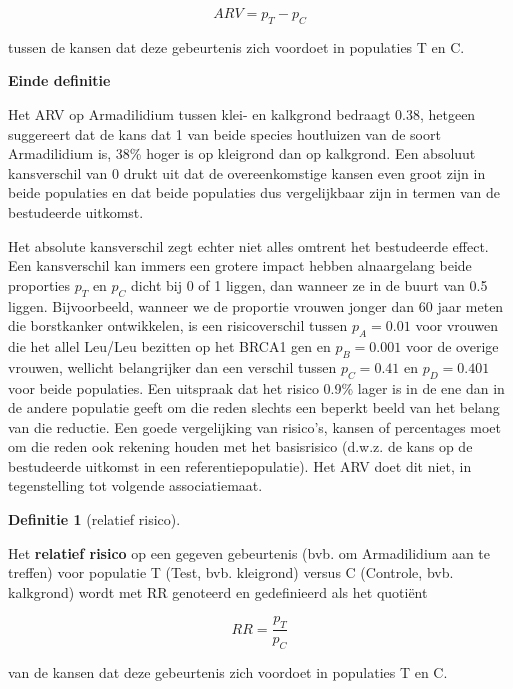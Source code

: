 \documentclass[
  12pt,dutch,coursenotes]{book}
\theoremstyle{definition}
\newtheorem{definition}{Definitie}[chapter]
\theoremstyle{definition}
\theoremstyle{definition}
\theoremstyle{remark}
\begin{document}
\begin{equation*}
ARV=p_T-p_C
\end{equation*}

tussen de kansen dat deze gebeurtenis zich voordoet in populaties T en C.

\textbf{Einde definitie}

Het ARV op Armadilidium tussen klei- en kalkgrond bedraagt 0.38, hetgeen suggereert dat de kans dat 1 van beide species houtluizen van de soort Armadilidium is, 38\% hoger is op kleigrond dan op kalkgrond. Een absoluut kansverschil
van 0 drukt uit dat de overeenkomstige kansen even groot zijn in beide
populaties en dat beide populaties dus vergelijkbaar zijn in termen van de bestudeerde uitkomst.

Het absolute kansverschil zegt echter niet alles omtrent het
bestudeerde effect. Een kansverschil kan immers een grotere impact hebben
alnaargelang beide proporties \(p_T\) en \(p_C\) dicht bij 0 of 1 liggen, dan
wanneer ze in de buurt van 0.5 liggen.
Bijvoorbeeld, wanneer we de proportie
vrouwen jonger dan 60 jaar meten die borstkanker ontwikkelen, is
een risicoverschil tussen \(p_A=0.01\) voor vrouwen die het allel Leu/Leu bezitten op het BRCA1 gen
en \(p_B=0.001\) voor de overige vrouwen, wellicht belangrijker dan een verschil tussen \(p_C=0.41\) en \(p_D=0.401\) voor beide populaties. Een uitspraak dat het risico 0.9\% lager is in de ene dan in de andere populatie geeft om die reden slechts een beperkt beeld van het belang van die reductie. Een goede vergelijking van risico's, kansen of percentages moet om die reden ook rekening houden met het basisrisico (d.w.z. de kans op de bestudeerde uitkomst in een referentiepopulatie). Het ARV doet dit niet, in tegenstelling tot volgende associatiemaat.

\begin{definition}[relatief risico]
\protect\hypertarget{def:unnamed-chunk-111}{}{\label{def:unnamed-chunk-111} \iffalse (relatief risico) \fi{} }
\end{definition}
Het \textbf{relatief risico} op een gegeven gebeurtenis (bvb. om Armadilidium aan te treffen) voor populatie T (Test, bvb. kleigrond) versus C (Controle, bvb. kalkgrond) wordt met RR
genoteerd en gedefinieerd als het quotiënt

\begin{equation*}
RR=\frac{p_T}{p_C}
\end{equation*}

van de kansen dat deze gebeurtenis zich voordoet in populaties T en C.
\end{document}
